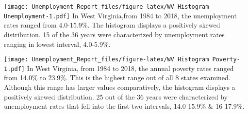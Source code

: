 \documentclass[
]{article}
\newenvironment{Shaded}{\begin{snugshade}}{\end{snugshade}}
\newcommand{\DataTypeTok}[1]{\textcolor[rgb]{0.13,0.29,0.53}{#1}}
\newcommand{\DecValTok}[1]{\textcolor[rgb]{0.00,0.00,0.81}{#1}}
\newcommand{\KeywordTok}[1]{\textcolor[rgb]{0.13,0.29,0.53}{\textbf{#1}}}
\newcommand{\NormalTok}[1]{#1}
\newcommand{\OperatorTok}[1]{\textcolor[rgb]{0.81,0.36,0.00}{\textbf{#1}}}
\newcommand{\StringTok}[1]{\textcolor[rgb]{0.31,0.60,0.02}{#1}}
\begin{document}
\begin{Shaded}
\end{Shaded}

\texttt{[image: Unemployment\_Report\_files/figure-latex/WV Histogram Unemployment-1.pdf]}
In West Virginia,from 1984 to 2018, the unemployment rates ranged from
4.0-15.9\%. The histogram displays a positively skewed distribution. 15
of the 36 years were characterized by unemployment rates ranging in
lowest interval, 4.0-5.9\%.

\begin{Shaded}
\end{Shaded}

\texttt{[image: Unemployment\_Report\_files/figure-latex/WV Histogram Poverty-1.pdf]}
In West Virginia, from 1984 to 2018, the annual poverty rates ranged
from 14.0\% to 23.9\%. This is the highest range out of all 8 states
examined. Although this range has larger values comparatively, the
histogram displays a positively skewed distribution. 25 out of the 36
years were characterized by unemployment rates that fell into the first
two intervals, 14.0-15.9\% \& 16-17.9\%.

\begin{Shaded}
\end{Shaded}
\end{document}
